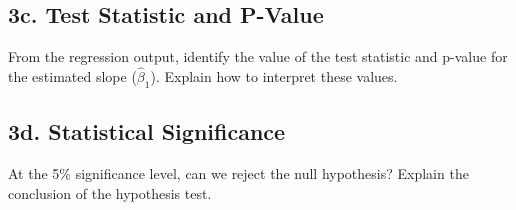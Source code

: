 \documentclass[a4paper, 11pt]{article}
\begin{document}
\subsection*{3c. Test Statistic and P-Value}

From the regression output, identify the value of the test statistic and p-value for the estimated slope ($\hat{\beta}_1$). Explain how to interpret these values.

\subsection*{3d. Statistical Significance}

At the 5\% significance level, can we reject the null hypothesis? Explain the conclusion of the hypothesis test.
\end{document}
